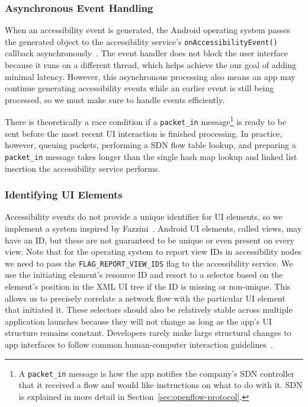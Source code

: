 \subsubsection{Asynchronous Event Handling}
\label{sec:asynchronous-event-handling}

When an accessibility event is generated, the Android operating system passes
the generated object to the accessibility service's
\texttt{onAccessibilityEvent()} callback
asynchronously~\cite{googledevelopers2020}. The event handler does not block the
user interface because it runs on a different thread, which helps achieve the
our goal of adding minimal latency. However, this asynchronous processing also
means an app may continue generating accessibility events while an earlier event
is still being processed, so we must make sure to handle events efficiently.

There is theoretically a race condition if a \texttt{packet\_in}
message\footnote{A \texttt{packet\_in} message is how the app notifies the
	company's SDN controller that it received a flow and would like instructions
	on what to do with it. SDN is explained in more detail in
	Section~\ref{sec:openflow-protocol}.} is ready to be sent before the most
recent UI interaction is finished processing.  In practice, however, queuing
packets, performing a SDN flow table lookup, and preparing a \texttt{packet\_in}
message takes longer than the single hash map lookup and linked list insertion
the accessibility service performs.

\subsubsection{Identifying UI Elements}
\label{sec:identifying-ui-elements}

Accessibility events do not provide a unique identifier for UI elements, so we
implement a system inspired by Fazzini~\etal \cite{fazzini2017}. Android UI
elements, called views, may have an ID, but these are not guaranteed to be
unique or even present on every view. Note that for the operating system to
report view IDs in accessibility nodes we need to pass the
\texttt{FLAG\_REPORT\_VIEW\_IDS} flag to the accessibility service. We use the
initiating element's resource ID and resort to a selector based on the element's
position in the XML UI tree if the ID is missing or non-unique. This allows us
to precisely correlate a network flow with the particular UI element that
initiated it. These selectors should also be relatively stable across multiple
application launches because they will not change as long as the app's UI
structure remains constant. Developers rarely make large structural changes to
app interfaces to follow common human-computer interaction
guidelines~\cite{norman2013}.

